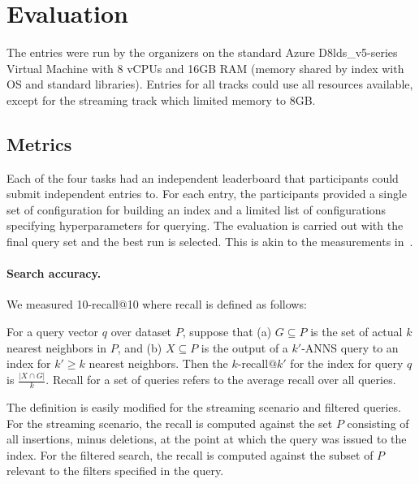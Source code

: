 
\section{Evaluation}
\label{sec:eval}

\newcommand{\recall}[2]{${#1}$-recall$@{#2}$} 

The entries were run by the organizers on the standard Azure D8lds\_v5-series Virtual Machine with
8 vCPUs and 16GB RAM (memory shared by index with OS and standard libraries).
Entries for all tracks could use all resources available, except for the streaming track which limited memory to 8GB.

\subsection{Metrics}

Each of the four tasks had an independent leaderboard that participants could submit independent entries to.
%
For each entry,  the participants provided a single set of configuration for building an index 
and a limited list of configurations specifying hyperparameters for querying.
%
The evaluation is carried out with the final query set and the best run is selected.
%
This is akin to the measurements in~\cite{FaissBenchmarks,Benchmark, DBLP:conf/nips/SimhadriWADBBCH21}.

\paragraph{Search accuracy.}
We measured 10-recall@10 where recall is defined as follows:

\begin{definition}
  \label{def:recall}
  For a query vector $q$ over dataset $P$, suppose that (a) $G
  \subseteq P$ is the set of actual $k$ nearest neighbors in $P$, and
  (b) $X \subseteq P$ is the output of a $k'$-ANNS query to an index
  for $k' \geq k$ nearest neighbors. Then the \recall{k}{k'} for the
  index for query $q$ is $\frac{|X \cap G|}{k}$. Recall for a set of
  queries refers to the average recall over all queries.
\end{definition}

The definition is easily modified for the streaming scenario and filtered queries.
%
For the streaming scenario, the recall is computed against the set $P$ consisting
of all insertions, minus deletions, at the point at which the query was issued to the index.
%
%
For the filtered search, the recall is computed against the subset of $P$ relevant
to the filters specified in the query. 

